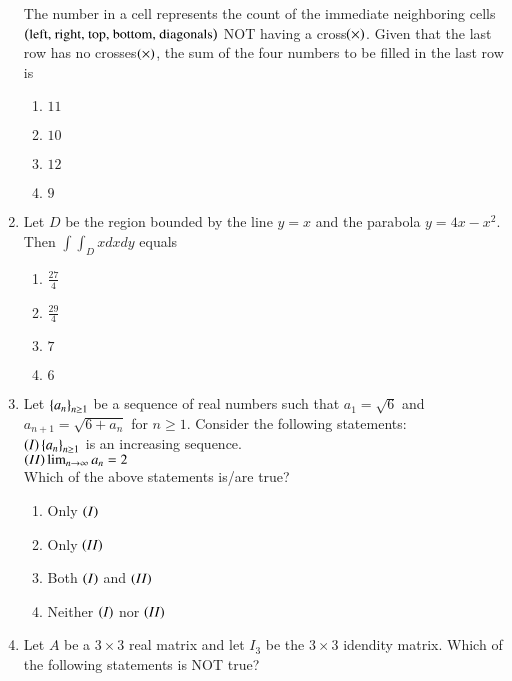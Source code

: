 \documentclass[journal]{IEEEtran}
\begin{document}
\begin{enumerate}
{\begin{figure}[H]
\label{fig:my_label}
\end{figure}
The number in a cell represents the count of the immediate neighboring cells $\left(\text{left, right, top, bottom, diagonals}\right)$ NOT having a cross$\left(\times\right)$. Given that the last row has no crosses$\left(\times\right)$, the sum of the four numbers to be filled in the last row is
\begin{multicols}{4}
\begin{enumerate}
\item $11$
\item $10$
\item $12$
\item $9$
\end{enumerate}
\end{multicols}
}
\item{
Let $D$ be the region bounded by the line $y=x$ and the parabola $y=4x-x^2$. Then $\int\int_Dxdxdy$ equals
\begin{multicols}{4}
\begin{enumerate}
\item $\frac{27}{4}$
\item $\frac{29}{4}$
\item $7$
\item $6$
\end{enumerate}
\end{multicols}
}
\item{
Let $\left\{a_n\right\}_{n\geq 1}$ be a sequence of real numbers such that $a_1=\sqrt{6}$ and $a_{n+1}=\sqrt{6+a_n}$ for $n\geq 1$. Consider the following statements:\\
$\left(I\right)\left\{a_n\right\}_{n\geq 1}$ is an increasing sequence.\\
$\left(II\right)\lim_{n\to\infty}a_n=2$\\
Which of the above statements is/are true?
\begin{multicols}{2}
    \begin{enumerate}
        \item Only $\left(I\right)$
        \item Only $\left(II\right)$
        \item Both $\left(I\right)$ and $\left(II\right)$
        \item Neither $\left(I\right)$ nor $\left(II\right)$
    \end{enumerate}
\end{multicols}
}
\item{
Let $A$ be a $3\times 3$ real matrix and let $I_3$ be the $3\times 3$ idendity matrix. Which of the following statements is NOT true?
}
\end{enumerate}
\end{document}
